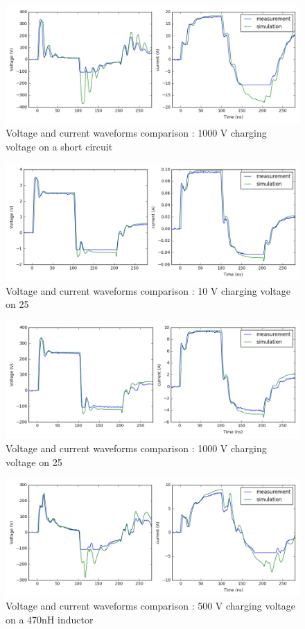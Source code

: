 \begin{figure}[!h]
  \centering
  \includegraphics[width=\textwidth]{src/2/figures/tlp_comparison_short_1000V.png}
  \caption{Voltage and current waveforms comparison : 1000 V charging voltage on a short circuit}
  \label{fig:comparison-tlp-short-1000V}
\end{figure}

\begin{figure}[!h]
  \centering
  \includegraphics[width=\textwidth]{src/2/figures/tlp_comparison_R25_10V.png}
  \caption{Voltage and current waveforms comparison : 10 V charging voltage on 25\textOmega{}}
  \label{fig:comparison-tlp-load-10v}
\end{figure}

\begin{figure}[!h]
  \centering
  \includegraphics[width=\textwidth]{src/2/figures/tlp_comparison_R25_1000V.png}
  \caption{Voltage and current waveforms comparison : 1000 V charging voltage on 25\textOmega{}}
  \label{fig:comparison-tlp-load-1000v}
\end{figure}

\begin{figure}[!h]
  \centering
  \includegraphics[width=\textwidth]{src/2/figures/tlp_comparison_470nH_500V.png}
  \caption{Voltage and current waveforms comparison : 500 V charging voltage on a 470nH inductor}
  \label{fig:comparison-tlp-inductor}
\end{figure}
